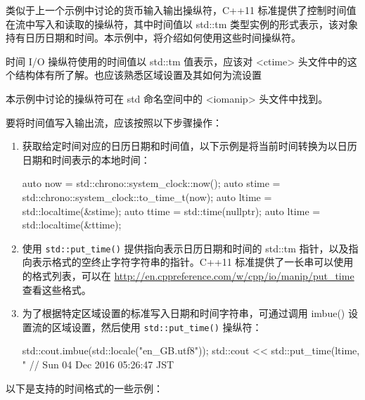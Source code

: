 类似于上一个示例中讨论的货币输入输出操纵符，C++11 标准提供了控制时间值在流中写入和读取的操纵符，其中时间值以 std::tm 类型实例的形式表示，该对象持有日历日期和时间。本示例中，将介绍如何使用这些时间操纵符。


时间 I/O 操纵符使用的时间值以 std::tm 值表示，应该对 <ctime> 头文件中的这个结构体有所了解。也应该熟悉区域设置及其如何为流设置

本示例中讨论的操纵符可在 std 命名空间中的 <iomanip> 头文件中找到。


要将时间值写入输出流，应该按照以下步骤操作：

\begin{enumerate}
\item
获取给定时间对应的日历日期和时间值，以下示例是将当前时间转换为以日历日期和时间表示的本地时间：

\begin{cpp}
auto now = std::chrono::system_clock::now();
auto stime = std::chrono::system_clock::to_time_t(now);
auto ltime = std::localtime(&stime);
auto ttime = std::time(nullptr);
auto ltime = std::localtime(&ttime);
\end{cpp}

\item
使用 \verb|std::put_time()| 提供指向表示日历日期和时间的 std::tm 指针，以及指向表示格式的空终止字符字符串的指针。C++11 标准提供了一长串可以使用的格式列表，可以在 \url{http://en.cppreference.com/w/cpp/io/manip/put_time} 查看这些格式。

\item
为了根据特定区域设置的标准写入日期和时间字符串，可通过调用 imbue() 设置流的区域设置，然后使用 \verb|std::put_time()| 操纵符：

\begin{cpp}
std::cout.imbue(std::locale("en_GB.utf8"));
std::cout << std::put_time(ltime, "%
// Sun 04 Dec 2016 05:26:47 JST
\end{cpp}
\end{enumerate}

以下是支持的时间格式的一些示例：

